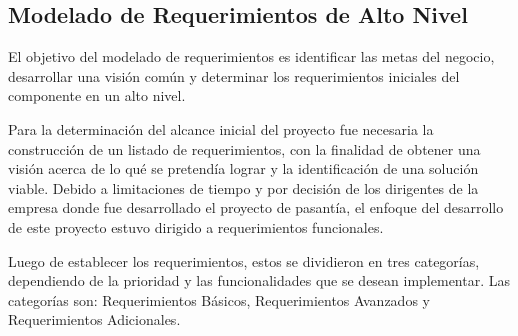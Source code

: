 \subsection{Modelado de Requerimientos de Alto Nivel}

El objetivo del modelado de requerimientos es identificar las metas
del negocio, desarrollar una visión común y determinar los requerimientos
iniciales del componente en un alto nivel. 

Para la determinación del alcance inicial del proyecto fue necesaria
la construcción de un listado de requerimientos, con la finalidad
de obtener una visión acerca de lo qué se pretendía lograr y la identificación
de una solución viable. Debido a limitaciones de tiempo y por decisión
de los dirigentes de la empresa donde fue desarrollado el proyecto
de pasantía, el enfoque del desarrollo de este proyecto estuvo dirigido
a requerimientos funcionales.

Luego de establecer los requerimientos, estos se dividieron en tres
categorías, dependiendo de la prioridad y las funcionalidades que
se desean implementar. Las categorías son: Requerimientos Básicos,
Requerimientos Avanzados y Requerimientos Adicionales.

